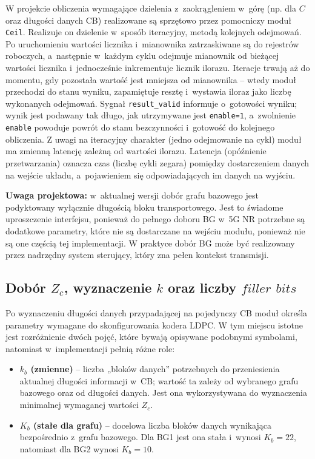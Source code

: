 W projekcie obliczenia wymagające dzielenia z~zaokrągleniem w~górę (np. dla $C$ oraz długości danych CB) realizowane są sprzętowo przez pomocniczy moduł \texttt{Ceil}. Realizuje on dzielenie w~sposób iteracyjny, metodą kolejnych odejmowań. Po uruchomieniu  wartości licznika i~mianownika zatrzaskiwane są do rejestrów roboczych, a~następnie w~każdym cyklu odejmuje mianownik od bieżącej wartości licznika i~jednocześnie inkrementuje licznik ilorazu. Iteracje trwają aż do momentu, gdy pozostała wartość jest mniejsza od mianownika -- wtedy moduł przechodzi do stanu wyniku, zapamiętuje resztę i~wystawia iloraz jako liczbę wykonanych odejmowań. Sygnał \texttt{result\_valid} informuje o~gotowości wyniku; wynik jest podawany tak długo, jak utrzymywane jest \texttt{enable=1}, a~zwolnienie \texttt{enable} powoduje powrót do stanu bezczynności i~gotowość do kolejnego obliczenia. Z uwagi na iteracyjny charakter (jedno odejmowanie na cykl) moduł ma zmienną latencję zależną od wartości ilorazu. Latencja (opóźnienie przetwarzania) oznacza czas (liczbę cykli zegara) pomiędzy dostarczeniem danych na wejście układu, a~pojawieniem się odpowiadających im danych na wyjściu.


\textbf{Uwaga projektowa:} w~aktualnej wersji dobór grafu bazowego jest podyktowany wyłącznie długością bloku transportowego. Jest to świadome uproszczenie interfejsu, ponieważ do pełnego doboru BG w~5G NR potrzebne są dodatkowe parametry, które nie są dostarczane na wejściu modułu, ponieważ nie są one częścią tej implementacji. W praktyce dobór BG może być realizowany przez nadrzędny system sterujący, który zna pełen kontekst transmisji.

\subsection{Dobór $Z_c$, wyznaczenie $k$ oraz liczby $filler$ $bits$}
\label{subsec:ldpc_prep_zc_k_filler}

Po wyznaczeniu długości danych przypadającej na pojedynczy CB moduł określa parametry wymagane do skonfigurowania kodera LDPC. W tym miejscu istotne jest rozróżnienie dwóch pojęć, które bywają opisywane podobnymi symbolami, natomiast w~implementacji pełnią różne role:

\begin{itemize}
  \item \textbf{$k_b$ (zmienne)} -- liczba „bloków danych” potrzebnych do przeniesienia aktualnej długości informacji w~CB; wartość ta zależy od wybranego grafu bazowego oraz od długości danych. Jest ona wykorzystywana do wyznaczenia minimalnej wymaganej wartości $Z_c$.
  \item \textbf{$K_b$ (stałe dla grafu)} -- docelowa liczba bloków danych wynikająca bezpośrednio z~grafu bazowego. Dla BG1 jest ona stała i~wynosi $K_b=22$, natomiast dla BG2 wynosi $K_b=10$.
\end{itemize}


